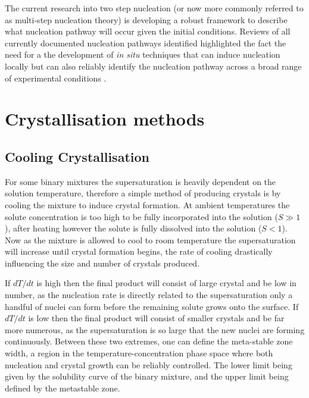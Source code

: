 The current research into two step nucleation (or now more commonly referred 
to as multi-step nucleation theory) is developing a robust framework to 
describe what nucleation pathway will occur given the initial conditions. 
Reviews of all currently documented nucleation pathways identified highlighted 
the fact the need for a the development of \textit{in situ} techniques that 
can induce nucleation locally but can also reliably identify the nucleation 
pathway across a broad range of experimental conditions \cite{Karthika2016, Fu2021}. 

\section{Crystallisation methods}
\subsection{Cooling Crystallisation}
For some binary mixtures the supersaturation is heavily dependent on 
the solution temperature, therefore a simple method of producing crystals 
is by cooling the mixture to induce crystal formation. At ambient 
temperatures the solute concentration is too high to be fully incorporated
into the solution ($S\gg 1$), after heating however the solute is fully dissolved
into the solution ($S<1$). Now as the mixture is allowed to cool to room
temperature the supersaturation will increase until crystal formation begins,
the rate of cooling drastically influencing the size and number of crystals
produced.

If $dT/dt$ is high then the final product will consist of large 
crystal and be low in number, as the nucleation rate is directly related
to the supersaturation only a handful of nuclei can form before the remaining
solute grows onto the surface. If $dT/dt$ is low then the final product will 
consist of smaller crystals and be far more numerous, as the supersaturation 
is so large that the new nuclei are forming continuously. Between these two 
extremes, one can define the meta-stable zone width, a region in the 
temperature-concentration phase space where both nucleation and crystal growth
can be reliably controlled. The lower limit being given by the solubility curve
of the binary mixture, and the upper limit being defined by the metastable zone.

